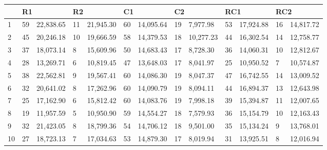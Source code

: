 \begin{table}[caption={Best Results, 600 Locations}, label=tab:2]
    \begin{tabular}{lllllllllllll}
        \toprule
        & \multicolumn{2}{l}{R1} & \multicolumn{2}{l}{R2} & \multicolumn{2}{l}{C1} & \multicolumn{2}{l}{C2} & \multicolumn{2}{l}{RC1} & \multicolumn{2}{l}{RC2} \\
        \midrule
        1  & 59 & 22,838.65 & 11 & 21,945.30 & 60 & 14,095.64 & 19 & 7,977.98  & 53 & 17,924.88 & 16 & 14,817.72 \\
        2  & 45 & 20,246.18 & 10 & 19,666.59 & 58 & 14,379.53 & 18 & 10,277.23 & 44 & 16,302.54 & 14 & 12,758.77 \\
        3  & 37 & 18,073.14 & 8  & 15,609.96 & 50 & 14,683.43 & 17 & 8,728.30  & 36 & 14,060.31 & 10 & 12,812.67 \\
        4  & 28 & 13,269.71 & 6  & 10,819.45 & 47 & 13,648.03 & 17 & 8,041.97  & 25 & 10,950.52 & 7  & 10,574.87 \\
        5  & 38 & 22,562.81 & 9  & 19,567.41 & 60 & 14,086.30 & 19 & 8,047.37  & 47 & 16,742.55 & 14 & 13,009.52 \\
        6  & 32 & 20,641.02 & 8  & 17,262.96 & 60 & 14,090.79 & 19 & 8,094.11  & 44 & 16,894.37 & 13 & 12,643.98 \\
        7  & 25 & 17,162.90 & 6  & 15,812.42 & 60 & 14,083.76 & 19 & 7,998.18  & 39 & 15,394.87 & 11 & 12,007.65 \\
        8  & 19 & 11,957.59 & 5  & 10,950.90 & 59 & 14,554.27 & 18 & 7,579.93  & 36 & 15,154.79 & 10 & 12,163.43 \\
        9  & 32 & 21,423.05 & 8  & 18,799.36 & 54 & 14,706.12 & 18 & 9,501.00  & 35 & 15,134.24 & 9  & 13,768.01 \\
        10 & 27 & 18,723.13 & 7  & 17,034.63 & 53 & 14,879.30 & 17 & 8,019.94  & 31 & 13,925.51 & 8  & 12,016.94 \\
    \end{tabular} \\
\end{table}

